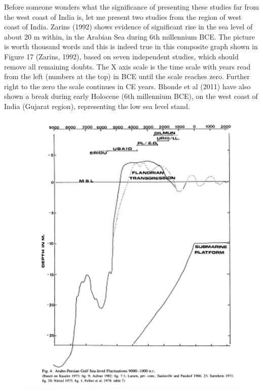 Before someone wonders what the significance of presenting these studies far from the west coast of India is, let me present two studies from the region of west coast of India. Zarins (1992) shows evidence of significant rise in the sea level of about 20 m within, in the Arabian Sea during 6th millennium BCE. The picture is worth thousand words and this is indeed true in this composite graph shown in Figure 17 (Zarins, 1992), based on seven independent studies, which should remove all remaining doubts. The X axis scale is the time scale with years read from the left (numbers at the top) in BCE until the scale reaches zero. Further right to the zero the scale continues in CE years. Bhonde et al (2011) have also shown a break during early Holocene (6th millennium BCE), on the west coast of India (Gujarat region), representing the low sea level stand.

\begin{figure}[!htbp]
\includegraphics[scale=0.33]{"images/8-17.jpg"}
\caption{}\label{art8-fig17}
\end{figure}


